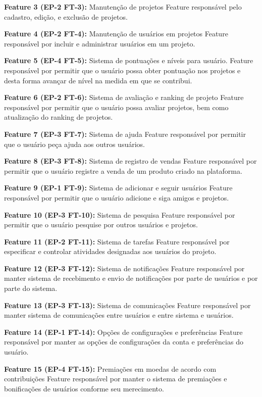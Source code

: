\textbf{Feature 3 (EP-2 FT-3):} Manutenção de projetos
Feature responsável pelo cadastro, edição, e exclusão de projetos.

\textbf{Feature 4 (EP-2 FT-4):} Manutenção de usuários em projetos
Feature responsável por incluir e administrar usuários em um projeto.

\textbf{Feature 5 (EP-4 FT-5):} Sistema de pontuações e níveis para usuário.
Feature responsável por permitir que o usuário possa obter pontuação nos projetos e desta forma avançar de nível na medida em que se contribui.

\textbf{Feature 6 (EP-2 FT-6):} Sistema de avaliação e ranking de projeto
Feature responsável por permitir que o usuário possa avaliar projetos, bem como atualização do ranking de projetos.

\textbf{Feature 7 (EP-3 FT-7):} Sistema de ajuda
Feature responsável por permitir que o usuário peça ajuda aos outros usuários.

\textbf{Feature 8 (EP-3 FT-8):} Sistema de registro de vendas
Feature responsável por permitir que o usuário registre a venda de um produto criado na plataforma.

\textbf{Feature 9 (EP-1 FT-9):} Sistema de adicionar e seguir usuários
Feature responsável por permitir que o usuário adicione e siga amigos e projetos.

\textbf{Feature 10 (EP-3 FT-10):} Sistema de pesquisa
Feature responsável por permitir que o usuário pesquise por outros usuários e projetos.

\textbf{Feature 11 (EP-2 FT-11):} Sistema de tarefas
Feature responsável por especificar e controlar atividades designadas aos usuários do projeto.

\textbf{Feature 12 (EP-3 FT-12):} Sistema de notificações
Feature responsável por manter sistema de recebimento e envio de notificações por parte de usuários e por parte do sistema.

\textbf{Feature 13 (EP-3 FT-13):} Sistema de comunicações
Feature responsável por manter sistema de comunicações entre usuários e entre sistema e usuários.

\textbf{Feature 14 (EP-1 FT-14):} Opções de configurações e preferências
Feature responsável por manter as opções de configurações da conta e preferências do usuário.

\textbf{Feature 15 (EP-4 FT-15):} Premiações em moedas de acordo com contribuições
Feature responsável por manter o sistema de premiações e bonificações de usuários conforme seu merecimento.

